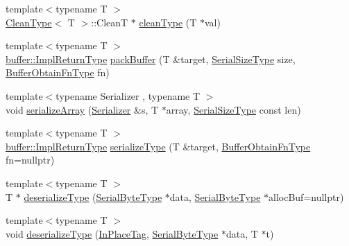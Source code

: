 \begin{DoxyCompactItemize}
\item 
{\footnotesize template$<$typename T $>$ }\\\hyperlink{structcheckpoint_1_1dispatch_1_1_clean_type}{Clean\+Type}$<$ T $>$\+::CleanT $\ast$ \hyperlink{namespacecheckpoint_1_1dispatch_ad92e256ab5d87d2a5a97ed6ed011af9c}{clean\+Type} (T $\ast$val)
\item 
{\footnotesize template$<$typename T $>$ }\\\hyperlink{namespacecheckpoint_1_1buffer_a4e930737a23dabd17333a8ea48c8edff}{buffer\+::\+Impl\+Return\+Type} \hyperlink{namespacecheckpoint_1_1dispatch_aca3c0f09e49b43fb6f3d82fe39e89295}{pack\+Buffer} (T \&target, \hyperlink{namespacecheckpoint_a083f6674da3f94c2901b18c6d238217c}{Serial\+Size\+Type} size, \hyperlink{namespacecheckpoint_a8a2558a1dd0db386339dd81c193b7f10}{Buffer\+Obtain\+Fn\+Type} fn)
\item 
{\footnotesize template$<$typename Serializer , typename T $>$ }\\void \hyperlink{namespacecheckpoint_1_1dispatch_a055fa8c0078dbd129325b1038079d87d}{serialize\+Array} (\hyperlink{structcheckpoint_1_1_serializer}{Serializer} \&s, T $\ast$array, \hyperlink{namespacecheckpoint_a083f6674da3f94c2901b18c6d238217c}{Serial\+Size\+Type} const len)
\item 
{\footnotesize template$<$typename T $>$ }\\\hyperlink{namespacecheckpoint_1_1buffer_a4e930737a23dabd17333a8ea48c8edff}{buffer\+::\+Impl\+Return\+Type} \hyperlink{namespacecheckpoint_1_1dispatch_a721d20cfc6479ca5e029671a56915adc}{serialize\+Type} (T \&target, \hyperlink{namespacecheckpoint_a8a2558a1dd0db386339dd81c193b7f10}{Buffer\+Obtain\+Fn\+Type} fn=nullptr)
\item 
{\footnotesize template$<$typename T $>$ }\\T $\ast$ \hyperlink{namespacecheckpoint_1_1dispatch_aa6898b55f6fb0de0b628567087cc8755}{deserialize\+Type} (\hyperlink{namespacecheckpoint_ae57f01cdc0b81776c23b6c7c934c58f5}{Serial\+Byte\+Type} $\ast$data, \hyperlink{namespacecheckpoint_ae57f01cdc0b81776c23b6c7c934c58f5}{Serial\+Byte\+Type} $\ast$alloc\+Buf=nullptr)
\item 
{\footnotesize template$<$typename T $>$ }\\void \hyperlink{namespacecheckpoint_1_1dispatch_a1830f5dccc7209dc2bbb3b7ac238c36a}{deserialize\+Type} (\hyperlink{structcheckpoint_1_1dispatch_1_1_in_place_tag}{In\+Place\+Tag}, \hyperlink{namespacecheckpoint_ae57f01cdc0b81776c23b6c7c934c58f5}{Serial\+Byte\+Type} $\ast$data, T $\ast$t)

\end{DoxyCompactItemize}
